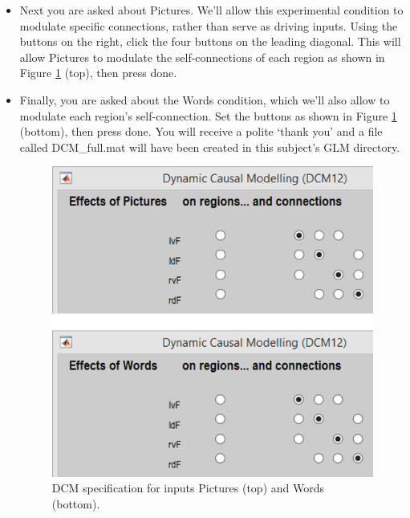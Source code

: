 \documentclass{article}
\begin{document}
\begin{itemize}
\item Next you are asked about Pictures. We'll allow this experimental condition to modulate specific connections, rather than serve as driving inputs. Using the buttons on the right, click the four buttons on the leading diagonal. This will allow Pictures to modulate the self-connections of each region as shown in Figure \ref{Fig_dcm_spec_Pictures_Words} (top), then press done.

\item Finally, you are asked about the Words condition, which we'll also allow to modulate each region's self-connection. Set the buttons as shown in Figure \ref{Fig_dcm_spec_Pictures_Words} (bottom), then press done. You will receive a polite `thank you' and a file called DCM\_full.mat will have been created in this subject's GLM directory.

\begin{figure}[ht]
\begin{center}
\includegraphics{"Fig_dcm_spec_Pictures_Words"}
\caption{DCM specification for inputs Pictures (top) and Words (bottom).\label{Fig_dcm_spec_Pictures_Words}}
\end{center}
\end{figure}

\end{itemize}
\end{document}
